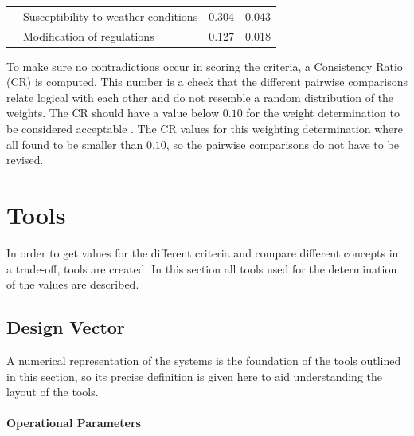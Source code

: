 \begin{table}[H]
{\begin{tabular}{l|l|c|c}
                                                                                          & Susceptibility to weather conditions & 0.304                 & 0.043                 \\ \cline{2-4} 
                                                                                          & Modification of regulations          & 0.127                 & 0.018                 \\ \hline
\end{tabular}%
}
\end{table}

To make sure no contradictions occur in scoring the criteria, a Consistency Ratio (CR) is computed. This number is a check that the different pairwise comparisons relate logical with each other and do not resemble a random distribution of the weights. The CR should have a value below $0.10$ for the weight determination to be considered acceptable \cite{AHPtut}. The CR values for this weighting determination where all found to be smaller than $0.10$, so the pairwise comparisons do not have to be revised.

\section{Tools}
\label{sec:Tools}

In order to get values for the different criteria and compare different concepts in a trade-off, tools are created. In this section all tools used for the determination of the values are described.

\subsection{Design Vector}
\label{subsec:desvector}
A numerical representation of the systems is the foundation of the tools outlined in this section, so its precise definition is given here to aid understanding the layout of the tools.

\paragraph{Operational Parameters}

